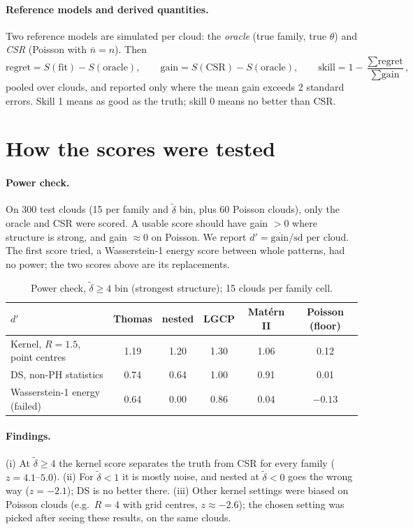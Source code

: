 \documentclass[11pt]{article}
\begin{document}
\paragraph{Reference models and derived quantities.}
Two reference models are simulated per cloud: the \emph{oracle} (true family, true $\theta$) and \emph{CSR}
(Poisson with $\bar n=n$). Then
\[
  \text{regret}=S(\text{fit})-S(\text{oracle}),\qquad
  \text{gain}=S(\text{CSR})-S(\text{oracle}),\qquad
  \text{skill}=1-\frac{\sum\text{regret}}{\sum\text{gain}},
\]
pooled over clouds, and reported only where the mean gain exceeds 2 standard errors. Skill 1 means as good as
the truth; skill 0 means no better than CSR.

\section*{How the scores were tested}
\paragraph{Power check.}
On 300 test clouds (15 per family and $\tilde\delta$ bin, plus 60 Poisson clouds), only the oracle and CSR
were scored. A usable score should have gain $>0$ where structure is strong, and gain $\approx0$ on Poisson.
We report $d'=\overline{\text{gain}}/\text{sd}$ per cloud. The first score tried, a Wasserstein-1 energy score
between whole patterns, had no power; the two scores above are its replacements.

\begin{table}[h]
\centering
\begin{tabular}{lccccc}
\toprule
$d'$ & Thomas & nested & LGCP & Mat\'ern II & Poisson (floor) \\
\midrule
Kernel, $R{=}1.5$, point centres & 1.19 & 1.20 & 1.30 & 1.06 & 0.12 \\
DS, non-PH statistics            & 0.74 & 0.64 & 1.00 & 0.91 & 0.01 \\
Wasserstein-1 energy (failed)    & 0.64 & 0.00 & 0.86 & 0.04 & $-0.13$ \\
\bottomrule
\end{tabular}
\caption{Power check, $\tilde\delta\ge4$ bin (strongest structure); 15 clouds per family cell.}
\end{table}

\paragraph{Findings.}
(i) At $\tilde\delta\ge4$ the kernel score separates the truth from CSR for every family ($z=4.1$--$5.0$).
(ii) For $\tilde\delta<1$ it is mostly noise, and nested at $\tilde\delta<0$ goes the wrong way ($z=-2.1$);
DS is no better there. (iii) Other kernel settings were biased on Poisson clouds (e.g.\ $R=4$ with grid
centres, $z\approx-2.6$); the chosen setting was picked after seeing these results, on the same clouds.
\end{document}

